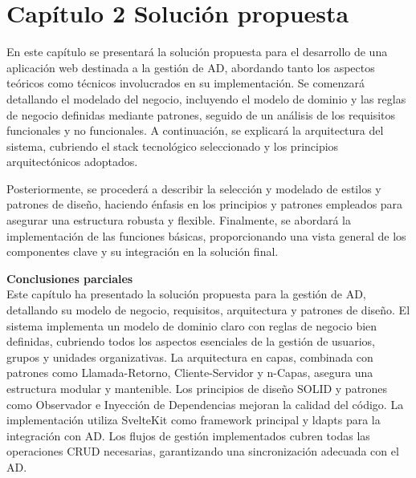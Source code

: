 \section{Capítulo 2 Solución propuesta}

En este capítulo se presentará la solución propuesta para el desarrollo de una aplicación web destinada a la gestión de AD, abordando tanto los aspectos teóricos como técnicos involucrados en su implementación. Se comenzará detallando el modelado del negocio, incluyendo el modelo de dominio y las reglas de negocio definidas mediante patrones, seguido de un análisis de los requisitos funcionales y no funcionales. A continuación, se explicará la arquitectura del sistema, cubriendo el stack tecnológico seleccionado y los principios arquitectónicos adoptados.

Posteriormente, se procederá a describir la selección y modelado de estilos y patrones de diseño, haciendo énfasis en los principios y patrones empleados para asegurar una estructura robusta y flexible. Finalmente, se abordará la implementación de las funciones básicas, proporcionando una vista general de los componentes clave y su integración en la solución final.









\textbf{Conclusiones parciales}\\
Este capítulo ha presentado la solución propuesta para la gestión de AD, detallando su modelo de negocio, requisitos, arquitectura y patrones de diseño. El sistema implementa un modelo de dominio claro con reglas de negocio bien definidas, cubriendo todos los aspectos esenciales de la gestión de usuarios, grupos y unidades organizativas. La arquitectura en capas, combinada con patrones como Llamada-Retorno, Cliente-Servidor y n-Capas, asegura una estructura modular y mantenible. Los principios de diseño SOLID y patrones como Observador e Inyección de Dependencias mejoran la calidad del código. La implementación utiliza SvelteKit como framework principal y ldapts para la integración con AD. Los flujos de gestión implementados cubren todas las operaciones CRUD necesarias, garantizando una sincronización adecuada con el AD.
